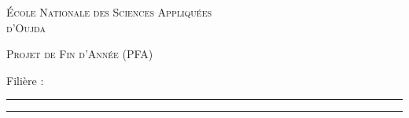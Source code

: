 \begin{titlepage}
\vspace{1.1cm}

{\LARGE\scshape École Nationale des Sciences Appliquées\\[2pt] d'Oujda\par}

\vspace{1.3cm}

{\Large\scshape Projet de Fin d'Année (PFA)\par}
\vspace{5pt}
{\large Filière : \mafiliere\par}

\vspace{1.1cm}

\noindent\textcolor{accentdark}{\rule{\linewidth}{1.4pt}}
\vspace{0.55cm}

{\Huge\bfseries \montitre\par}
\vspace{0.5cm}
{\large\itshape \monsoustitre\par}

\vspace{0.55cm}
\noindent\textcolor{accentdark}{\rule{\linewidth}{1.4pt}}

\vfill
\end{titlepage}
